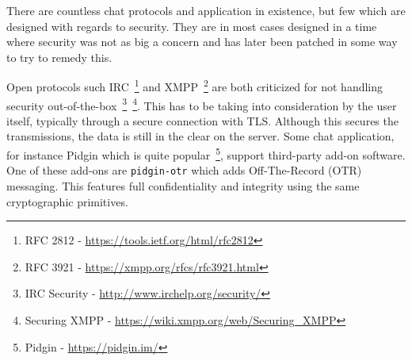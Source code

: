 There are countless chat protocols and application in existence, but
few which are designed with regards to security. They are in most
cases designed in a time where security was not as big a concern and
has later been patched in some way to try to remedy this.

Open protocols such IRC~\footnote{RFC 2812 -
  \url{https://tools.ietf.org/html/rfc2812}} and XMPP~\footnote{RFC
  3921 - \url{https://xmpp.org/rfcs/rfc3921.html}} are both criticized
for not handling security out-of-the-box~\footnote{IRC Security -
  \url{http://www.irchelp.org/security/}}~\footnote{Securing XMPP -
  \url{https://wiki.xmpp.org/web/Securing_XMPP}}. This has to be
taking into consideration by the user itself, typically through a
secure connection with TLS. Although this secures the transmissions,
the data is still in the clear on the server. Some chat application,
for instance Pidgin which is quite popular~\footnote{Pidgin -
  \url{https://pidgin.im/}}, support third-party add-on software. One
of these add-ons are {\tt pidgin-otr} which adds Off-The-Record (OTR)
messaging. This features full confidentiality and integrity using the
same cryptographic primitives.
